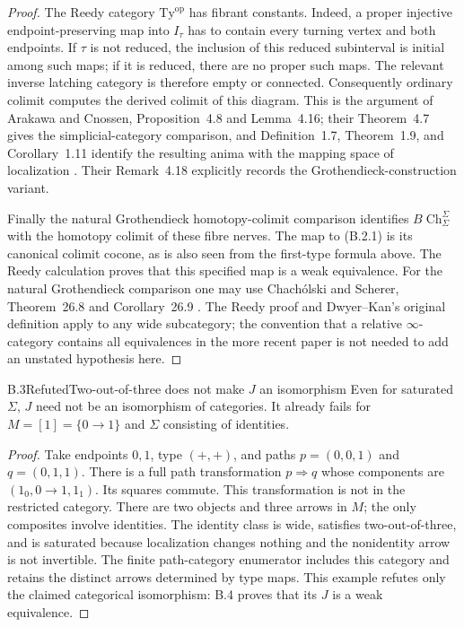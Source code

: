 \begin{proof}
The Reedy category $\mathrm{Ty}^{\mathrm{op}}$ has fibrant constants. Indeed, a proper injective endpoint-preserving map into $I_\tau$ has to contain every turning vertex and both endpoints. If $\tau$ is not reduced, the inclusion of this reduced subinterval is initial among such maps; if it is reduced, there are no proper such maps. The relevant inverse latching category is therefore empty or connected. Consequently ordinary colimit computes the derived colimit of this diagram. This is the argument of Arakawa and Cnossen, Proposition~4.8 and Lemma~4.16; their Theorem~4.7 gives the simplicial-category comparison, and Definition~1.7, Theorem~1.9, and Corollary~1.11 identify the resulting anima with the mapping space of localization \citep{ArakawaCnossenPATHS}. Their Remark~4.18 explicitly records the Grothendieck-construction variant.

Finally the natural Grothendieck homotopy-colimit comparison identifies
$B\operatorname{Ch}_\Sigma^\Sigma$ with the homotopy colimit of these fibre nerves. The map to (B.2.1) is its canonical colimit cocone, as is also seen from the first-type formula above. The Reedy calculation proves that this specified map is a weak equivalence. For the natural Grothendieck comparison one may use Chach\'olski and Scherer, Theorem~26.8 and Corollary~26.9 \citep{ChacholskiSchererPATHS}. The Reedy proof and Dwyer--Kan's original definition apply to any wide subcategory; the convention that a relative $\infty$-category contains all equivalences in the more recent paper is not needed to add an unstated hypothesis here.
\end{proof}

\begin{result}{B.3}{Refuted}{Two-out-of-three does not make $J$ an isomorphism}
Even for saturated $\Sigma$, $J$ need not be an isomorphism of categories. It already fails for $M=[1]=\{0\to1\}$ and $\Sigma$ consisting of identities.
\end{result}
\begin{proof}
Take endpoints $0,1$, type $(+,+)$, and paths
$p=(0,0,1)$ and $q=(0,1,1)$. There is a full path transformation
$p\Rightarrow q$ whose components are
$(1_0,0\to1,1_1)$. Its squares commute. This transformation is not in the restricted category. There are two objects and three arrows in $M$; the only composites involve identities. The identity class is wide, satisfies two-out-of-three, and is saturated because localization changes nothing and the nonidentity arrow is not invertible. The finite path-category enumerator includes this category and retains the distinct arrows determined by type maps. This example refutes only the claimed categorical isomorphism: B.4 proves that its $J$ is a weak equivalence.
\end{proof}

